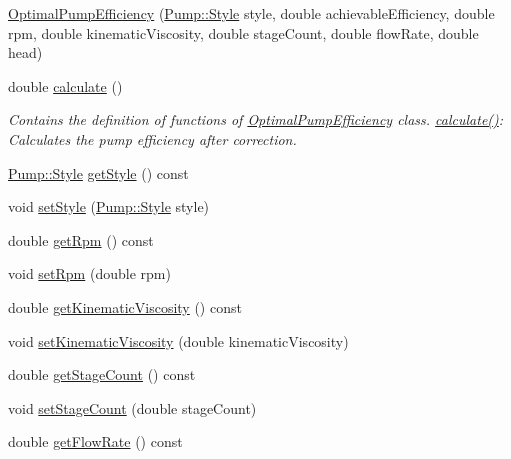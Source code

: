 \begin{DoxyCompactItemize}
\item 
\hyperlink{class_optimal_pump_efficiency_ae07626ea079ff810ac6518d54c52b24a}{Optimal\+Pump\+Efficiency} (\hyperlink{class_pump_aef354601ce4218258cc898b35a1e90ff}{Pump\+::\+Style} style, double achievable\+Efficiency, double rpm, double kinematic\+Viscosity, double stage\+Count, double flow\+Rate, double head)
\item 
double \hyperlink{class_optimal_pump_efficiency_ac40720d1fcdf40d8b364df37e58e7f4d}{calculate} ()
\begin{DoxyCompactList}\small\item\em Contains the definition of functions of \hyperlink{class_optimal_pump_efficiency}{Optimal\+Pump\+Efficiency} class. \hyperlink{class_optimal_pump_efficiency_ac40720d1fcdf40d8b364df37e58e7f4d}{calculate()}\+: Calculates the pump efficiency after correction. \end{DoxyCompactList}\item 
\hyperlink{class_pump_aef354601ce4218258cc898b35a1e90ff}{Pump\+::\+Style} \hyperlink{class_optimal_pump_efficiency_a601fe15e9acc23112743fabe417030fb}{get\+Style} () const
\item 
void \hyperlink{class_optimal_pump_efficiency_ab6b85c8c08d6641c5375c65436f16a2f}{set\+Style} (\hyperlink{class_pump_aef354601ce4218258cc898b35a1e90ff}{Pump\+::\+Style} style)
\item 
double \hyperlink{class_optimal_pump_efficiency_a58e8a430ced612e0518abd07fb30b085}{get\+Rpm} () const
\item 
void \hyperlink{class_optimal_pump_efficiency_afc6b6f46b4e289efc8819249ad1c9fb5}{set\+Rpm} (double rpm)
\item 
double \hyperlink{class_optimal_pump_efficiency_a8c2f7fcacce2b42ed83f29aec2d4671e}{get\+Kinematic\+Viscosity} () const
\item 
void \hyperlink{class_optimal_pump_efficiency_a00017e0bd100beb2f4b0bf2db5e3687f}{set\+Kinematic\+Viscosity} (double kinematic\+Viscosity)
\item 
double \hyperlink{class_optimal_pump_efficiency_aac0c1a4a6492bf00b245c2a61d100eaa}{get\+Stage\+Count} () const
\item 
void \hyperlink{class_optimal_pump_efficiency_a5b0b2a24a87c1c8fc92aa96c6ba4b727}{set\+Stage\+Count} (double stage\+Count)
\item 
double \hyperlink{class_optimal_pump_efficiency_a77c6618681b0fd3a0fc02dc49d16ee99}{get\+Flow\+Rate} () const
\item 

\end{DoxyCompactItemize}
